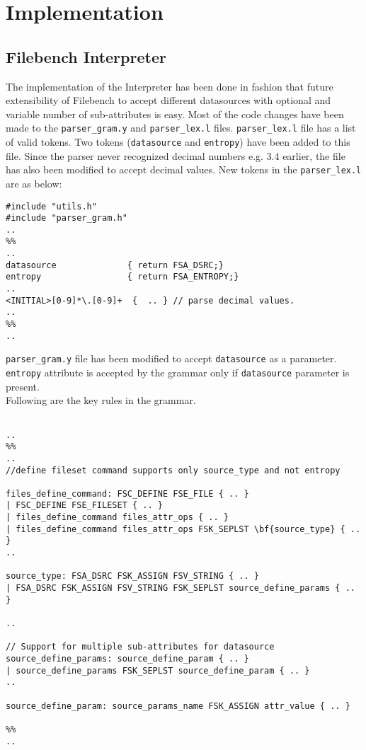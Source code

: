 \chapter{Implementation}\label{chap:imp}

\section{Filebench Interpreter}
The implementation of the Interpreter has been done in fashion that future extensibility of Filebench to accept different datasources with optional and variable number of sub-attributes is easy. Most of the code changes have been made to the \verb+parser_gram.y+ and \verb+parser_lex.l+ files. \verb+parser_lex.l+ file has a list of valid tokens. Two tokens (\verb+datasource+ and \verb+entropy+) have been added to this file. Since the parser never recognized decimal numbers e.g. 3.4 earlier, the file has also been modified to accept decimal values. New tokens in the \verb+parser_lex.l+ are as below:

\lstset{language=C}
\begin{lstlisting}
#include "utils.h"
#include "parser_gram.h"
..
%%
..
datasource              { return FSA_DSRC;}
entropy                 { return FSA_ENTROPY;}
..
<INITIAL>[0-9]*\.[0-9]+  {  .. } // parse decimal values.
..
%%
..
\end{lstlisting}

\noindent \verb+parser_gram.y+ file has been modified to accept \verb+datasource+ as a parameter. \verb+entropy+ attribute is accepted by the grammar only if \verb+datasource+ parameter is present.\\ Following are the key rules in the grammar.

\lstset{language=C}
\begin{lstlisting}

..
%%
..
//define fileset command supports only source_type and not entropy

files_define_command: FSC_DEFINE FSE_FILE { .. }
| FSC_DEFINE FSE_FILESET { .. }
| files_define_command files_attr_ops { .. }
| files_define_command files_attr_ops FSK_SEPLST \bf{source_type} { .. }     
..

source_type: FSA_DSRC FSK_ASSIGN FSV_STRING { .. }
| FSA_DSRC FSK_ASSIGN FSV_STRING FSK_SEPLST source_define_params { .. } 	

..

// Support for multiple sub-attributes for datasource
source_define_params: source_define_param { .. }
| source_define_params FSK_SEPLST source_define_param { .. }	        
..

source_define_param: source_params_name FSK_ASSIGN attr_value { .. }

%%
..
\end{lstlisting}


